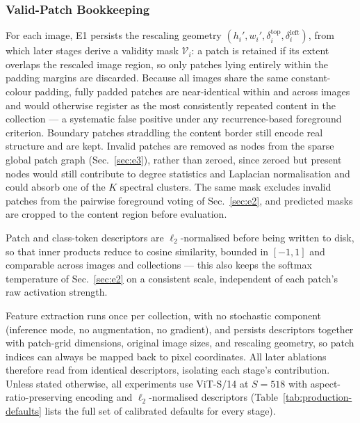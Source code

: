 \subsubsection{Valid-Patch Bookkeeping}

For each image, E1 persists the rescaling geometry
$(h_i', w_i', \delta_i^{\text{top}}, \delta_i^{\text{left}})$, from which
later stages derive a validity mask $\mathcal{V}_i$: a patch is retained
if its extent overlaps the rescaled image region, so only patches lying
entirely within the padding margins are discarded. Because all images
share the same constant-colour padding, fully padded patches are
near-identical within and across images and would otherwise register as
the most consistently repeated content in the collection — a systematic
false positive under any recurrence-based foreground criterion. Boundary
patches straddling the content border still encode real structure and
are kept. Invalid patches are removed as nodes from the sparse global
patch graph (Sec.~\ref{sec:e3}), rather than zeroed, since zeroed but
present nodes would still contribute to degree statistics and Laplacian
normalisation and could absorb one of the $K$ spectral clusters. The same
mask excludes invalid patches from the pairwise foreground voting of
Sec.~\ref{sec:e2}, and predicted masks are cropped to the content region
before evaluation.

Patch and class-token descriptors are $\ell_2$-normalised before being
written to disk, so that inner products reduce to cosine similarity,
bounded in $[-1,1]$ and comparable across images and collections — this
also keeps the softmax temperature of Sec.~\ref{sec:e2} on a consistent
scale, independent of each patch's raw activation strength.

Feature extraction runs once per collection, with no stochastic
component (inference mode, no augmentation, no gradient), and persists
descriptors together with patch-grid dimensions, original image sizes,
and rescaling geometry, so patch indices can always be mapped back to
pixel coordinates. All later ablations therefore read from identical
descriptors, isolating each stage's contribution. Unless stated
otherwise, all experiments use ViT-S/14 at $S=518$ with
aspect-ratio-preserving encoding and $\ell_2$-normalised descriptors
(Table~\ref{tab:production-defaults} lists the full set of calibrated
defaults for every stage).

